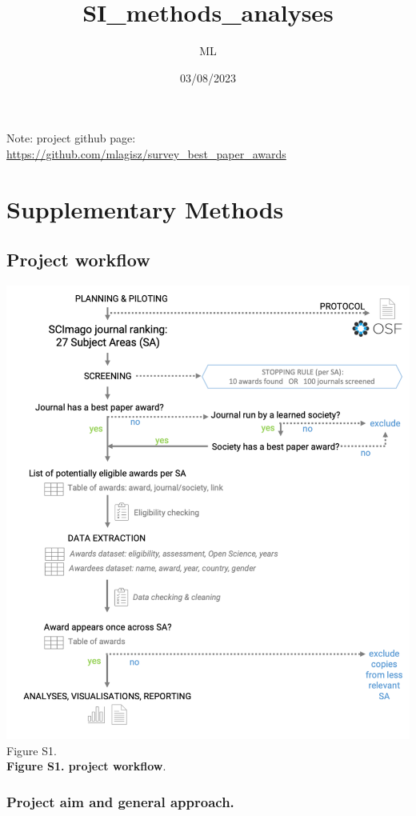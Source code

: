 \documentclass[
]{article}
\title{SI\_methods\_analyses}
\author{ML}
\date{03/08/2023}
\begin{document}
\maketitle

Note: project github page:
\url{https://github.com/mlagisz/survey_best_paper_awards}

\hypertarget{supplementary-methods}{%
\section{Supplementary Methods}\label{supplementary-methods}}

\hypertarget{project-workflow}{%
\subsection{Project workflow}\label{project-workflow}}

\includegraphics{../BP_awards_workflow_v2.png} Figure S1.\\
\textbf{Figure S1. project workflow}.

\hypertarget{project-aim-and-general-approach.}{%
\subsubsection{Project aim and general
approach.}\label{project-aim-and-general-approach.}}
\end{document}
